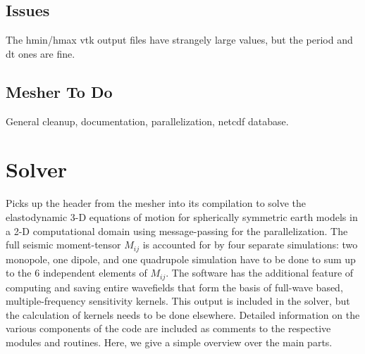 \documentclass[11pt,letter,fleqn,english,notitlepage]{article}
\begin{document}
\subsection{Issues}
The hmin/hmax vtk output files have strangely large values, but the period and
dt ones are fine.

\subsection{Mesher To Do}
General cleanup, documentation, parallelization, netcdf database.

\newpage
\section{Solver}
Picks up the header from the mesher into its compilation to solve the
elastodynamic 3-D equations of motion for spherically symmetric earth models in
a 2-D computational domain using message-passing for the parallelization. The
full seismic moment-tensor $M_{ij}$ is accounted for by four separate
simulations: two monopole, one dipole, and one quadrupole simulation have to be
done to sum up to the 6 independent elements of $M_{ij}$.  The software has the
additional feature of computing and saving entire wavefields that form the
basis of full-wave based, multiple-frequency sensitivity kernels. This output
is included in the solver, but the calculation of kernels needs to be done
elsewhere.  Detailed information on the various components of the code are
included as comments to the respective modules and routines. Here, we give a
simple overview over the main parts. 

\newpage
% 
% 
\end{document}
